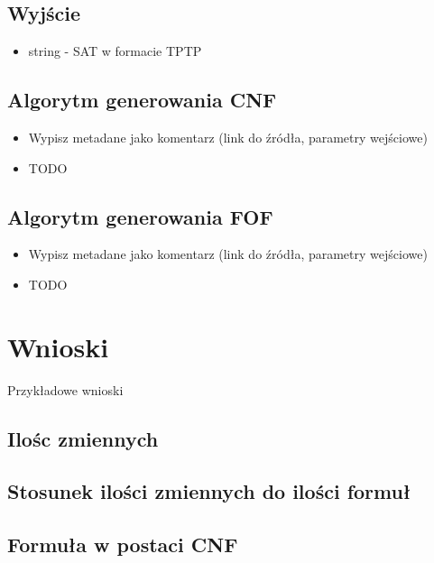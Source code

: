 \documentclass[a4paper,12pt]{article}
\begin{document}
\subsection{Wyjście}

\begin{itemize}
  \item string - SAT w formacie TPTP
\end{itemize}

\subsection{Algorytm generowania \gls{CNF}}
\begin{itemize}
  \item Wypisz metadane jako komentarz (link do źródła, parametry wejściowe)
  \item TODO
\end{itemize}

\subsection{Algorytm generowania \gls{FOF}}
\begin{itemize}
  \item Wypisz metadane jako komentarz (link do źródła, parametry wejściowe)
  \item TODO
\end{itemize}

\section{Wnioski}

Przykładowe wnioski

\subsection{Ilośc zmiennych}

\subsection{Stosunek ilości zmiennych do ilości formuł}

\subsection{Formuła w postaci CNF}

\printglossary[type=\acronymtype]
\printglossary
\end{document}
